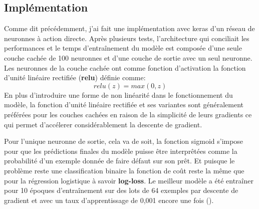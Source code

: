 \subsection{Implémentation}
\label{chap4.sec7.sub2}
Comme dit précédemment, j'ai fait une implémentation avec keras d'un réseau de neuronnes à action directe. Après plusieurs tests, l'architecture qui conciliait les performances et le temps d'entraînement du modèle est composée d'une seule couche cachée de 100 neuronnes et d'une couche de sortie avec un seul neuronne. Les neuronnes de la couche cachée ont comme fonction d'activation la fonction d'unité linéaire rectifiée (\textbf{relu}) définie comme: \[relu(z) = max(0, z)\] En plus d'introduire une forme de non linéarité dans le fonctionnement du modèle, la fonction d'unité linéaire rectifiée et ses variantes sont généralement préférées pour les couches cachées en raison de la simplicité de leurs gradients ce qui permet d'accélerer considérablement la descente de gradient.

Pour l'unique neuronne de sortie, cela va de soit, la fonction sigmoid s'impose pour que les prédictions finales du modèle puisse être interprêtées comme la probabilité d'un exemple donnée de faire défaut sur son prêt. Et puisque le problème reste une classification binaire la fonction de coût reste la même que pour la régression logistique à savoir \textbf{log-loss}. Le meilleur modèle a été entraîner pour 10 époques d'entraînement sur des lots de 64 exemples par descente de gradient et avec un taux d'apprentissage de 0,001 encore une fois (\cite{diarra2024notebooks}).